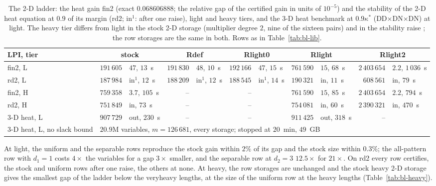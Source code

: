 \begin{table}[h]\centering\scriptsize
\setlength{\tabcolsep}{2pt}
\begin{tabular}{lrlrlrlrlrl}
\toprule
LPI, tier & \multicolumn{2}{c}{stock} & \multicolumn{2}{c}{Rdef} & \multicolumn{2}{c}{Rlight0} & \multicolumn{2}{c}{Rlight} & \multicolumn{2}{c}{Rlight2} \\
\midrule
fin2, L & $191\,605$ & $47$, $13$~s & $191\,830$ & $48$, $10$~s & $192\,166$ & $47$, $15$~s & $761\,590$ & $15$, $68$~s & $2\,403\,654$ & $2.2$, $1\,036$~s \\
rd2, L & $187\,984$ & in$^{1}$, $12$~s & $188\,209$ & in$^{1}$, $12$~s & $188\,545$ & in$^{1}$, $14$~s & $190\,321$ & in, $11$~s & $608\,561$ & in, $79$~s \\
fin2, H & $759\,358$ & $3.7$, $105$~s & -- & & -- & & $761\,590$ & $15$, $85$~s & $2\,403\,654$ & $2.2$, $794$~s \\
rd2, H & $751\,849$ & in, $73$~s & -- & & -- & & $754\,081$ & in, $60$~s & $2\,390\,321$ & in, $470$~s \\
3-D heat, L & $907\,729$ & out, $230$~s & -- & & -- & & $911\,425$ & out, $318$~s & -- & \\
3-D heat, L, no slack bound & \multicolumn{10}{l}{$20.9$M variables, $m=126\,681$, every storage; stopped at $20$~min, $49$~GB} \\
\bottomrule
\end{tabular}
\caption{The 2-D ladder: the heat gain fin2 (exact $0.068606888$; the relative gap of the certified gain in units of $10^{-5}$) and the stability of the 2-D heat equation at $0.9$ of its margin (rd2; in$^1$: after one raise), light and heavy tiers, and the 3-D heat benchmark at $0.9\kappa^*$ (DD$\times$DN$\times$DN) at light. The heavy tier differs from light in the stock 2-D storage (multiplier degree $2$, nine of the sixteen pairs) and in the stability raise ; the row storages are the same in both. Rows as in Table~\ref{tab:bl-lib}.}\label{tab:bl-fin2}
\end{table}

At light, the uniform and the separable rows reproduce the stock gain within $2\%$ of its gap and the stock size within $0.3\%$; the all-pattern row with $d_1=1$ costs $4\times$ the variables for a gap $3\times$ smaller, and the separable row at $d_2=3$ $12.5\times$ for $21\times$. On rd2 every row certifies, the stock and uniform rows after one raise, the others at none. At heavy, the row storages are unchanged and the stock heavy 2-D storage gives the smallest gap of the ladder below the veryheavy lengths, at the size of the uniform row at the heavy lengths (Table~\ref{tab:bl-heavy}).

